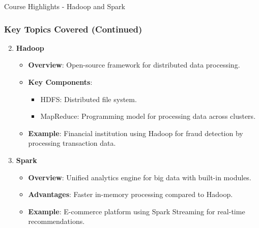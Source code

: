 \documentclass[aspectratio=169]{beamer}
\begin{document}
\begin{frame}[fragile]{Course Highlights - Hadoop and Spark}
  \frametitle{Key Topics Covered (Continued)}
  
  \begin{enumerate}
    \setcounter{enumi}{1} %
    \item \textbf{Hadoop}
    \begin{itemize}
      \item \textbf{Overview}: Open-source framework for distributed data processing.
      \item \textbf{Key Components}:
      \begin{itemize}
        \item HDFS: Distributed file system.
        \item MapReduce: Programming model for processing data across clusters.
      \end{itemize}
      \item \textbf{Example}: Financial institution using Hadoop for fraud detection by processing transaction data.
    \end{itemize}

    \item \textbf{Spark}
    \begin{itemize}
      \item \textbf{Overview}: Unified analytics engine for big data with built-in modules.
      \item \textbf{Advantages}: Faster in-memory processing compared to Hadoop.
      \item \textbf{Example}: E-commerce platform using Spark Streaming for real-time recommendations.
    \end{itemize}
  \end{enumerate}
\end{frame}
\end{document}
